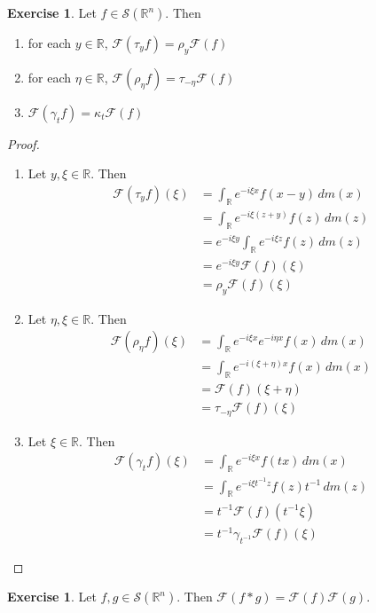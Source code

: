 \documentclass{book}
\theoremstyle{definition}
\newtheorem{ex}[definition]{Exercise}
\newcommand{\gam}{\gamma}
\newcommand{\kap}{\kappa}
\newcommand{\R}{\mathbb{R}}
\newcommand{\MF}{\mathcal{F}}
\newcommand{\MS}{\mathcal{S}}
\DeclareMathOperator*{\0}{\mbf{0}}
\DeclareMathOperator*{\1}{\mbf{1}}
\newcommand{\dm}{\, d m}
\begin{document}
	\begin{ex}
		Let $f \in \MS(\R^n)$. Then 
		\begin{enumerate}
			\item for each $y \in \R$, $\MF(\tau_yf) = \rho_{y} \MF(f)$ 
			\item for each $\eta \in \R$, $\MF(\rho_{\eta} f) = \tau_{-\eta} \MF(f)$
			\item $\MF(\gam_t f) = \kap_{t} \MF(f)$
		\end{enumerate}
	\end{ex}

	\begin{proof}\
		\begin{enumerate}
			\item Let $y, \xi \in \R$. Then 
			\begin{align*}
				\MF(\tau_yf)(\xi) 
				& = \int_{\R} e^{-i\xi x} f(x-y) \dm(x) \\
				& = \int_{\R} e^{-i\xi (z+y)} f(z) \dm(z) \\
				& = e^{-i\xi y} \int_{\R} e^{-i\xi z} f(z) \dm(z) \\
				& = e^{-i\xi y} \MF(f)(\xi) \\
				& = \rho_{y} \MF(f)(\xi)
			\end{align*}
			\item Let $\eta, \xi \in \R$. Then 
			\begin{align*}
				\MF(\rho_{\eta}f)(\xi) 
				& = \int_{\R} e^{-i\xi x} e^{-i\eta x}f(x) \dm(x) \\
				& = \int_{\R} e^{-i(\xi + \eta)x} f(x) \dm(x) \\
				& = \MF(f)(\xi + \eta) \\
				&= \tau_{-\eta}\MF(f)(\xi)
			\end{align*}
			\item Let $\xi \in \R$. Then 
			\begin{align*}
				\MF(\gam_t f)(\xi) 
				& = \int_{\R} e^{-i\xi x} f(tx) \dm(x) \\
				& = \int_{\R} e^{-i\xi t^{-1} z} f(z) t^{-1}\dm(z) \\
				& = t^{-1}\MF(f)(t^{-1} \xi) \\
				& = t^{-1} \gam_{t^{-1}} \MF(f)(\xi)
			\end{align*}
		\end{enumerate}
	\end{proof}

	\begin{ex}
		Let $f,g \in \MS(\R^n)$. Then $\MF(f*g) = \MF(f)\MF(g)$.
	\end{ex}
\end{document}
